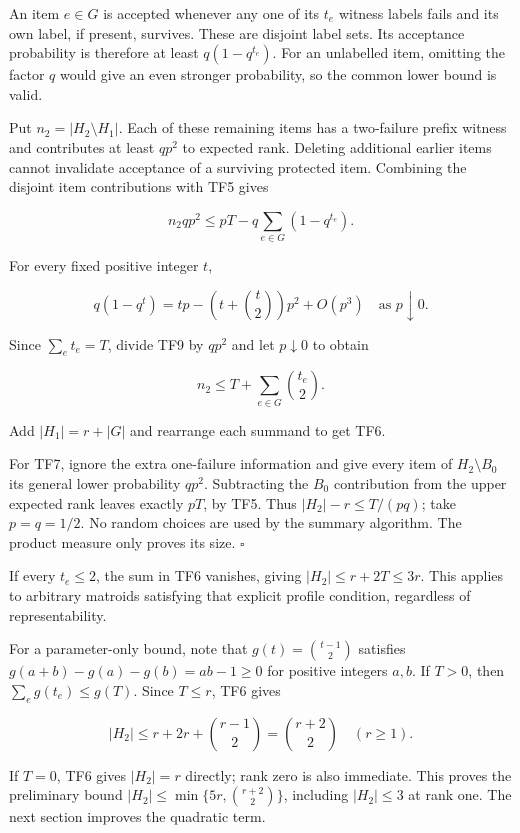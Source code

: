 An item \(e\in G\) is accepted whenever any one of its \(t_e\) witness labels fails and its own label, if present, survives. These are disjoint label sets. Its acceptance probability is therefore at least \(q(1-q^{t_e})\). For an unlabelled item, omitting the factor \(q\) would give an even stronger probability, so the common lower bound is valid.

Put \(n_2=|H_2\setminus H_1|\). Each of these remaining items has a two-failure prefix witness and contributes at least \(qp^2\) to expected rank. Deleting additional earlier items cannot invalidate acceptance of a surviving protected item. Combining the disjoint item contributions with TF5 gives

\[
n_2qp^2
\le pT-q\sum_{e\in G}(1-q^{t_e}).
\tag{TF9}
\]

For every fixed positive integer \(t\),

\[
q(1-q^t)
 =tp-\left(t+\binom{t}{2}\right)p^2+O(p^3)
\quad\text{as }p\downarrow0.
\]

Since \(\sum_e t_e=T\), divide TF9 by \(qp^2\) and let \(p\downarrow0\) to obtain

\[
n_2\le T+\sum_{e\in G}\binom{t_e}{2}.
\]

Add \(|H_1|=r+|G|\) and rearrange each summand to get TF6.

For TF7, ignore the extra one-failure information and give every item of \(H_2\setminus B_0\) its general lower probability \(qp^2\). Subtracting the \(B_0\) contribution from the upper expected rank leaves exactly \(pT\), by TF5. Thus \(|H_2|-r\le T/(pq)\); take \(p=q=1/2\). No random choices are used by the summary algorithm. The product measure only proves its size. \(\square\)

If every \(t_e\le2\), the sum in TF6 vanishes, giving \(|H_2|\le r+2T\le3r\). This applies to arbitrary matroids satisfying that explicit profile condition, regardless of representability.

For a parameter-only bound, note that \(g(t)=\binom{t-1}{2}\) satisfies \(g(a+b)-g(a)-g(b)=ab-1\ge0\) for positive integers \(a,b\). If \(T>0\), then \(\sum_e g(t_e)\le g(T)\). Since \(T\le r\), TF6 gives

\[
|H_2|\le r+2r+\binom{r-1}{2}=\binom{r+2}{2}
\quad(r\ge1).
\]

If \(T=0\), TF6 gives \(|H_2|=r\) directly; rank zero is also immediate. This proves the preliminary bound \(|H_2|\le\min\{5r,\binom{r+2}{2}\}\), including \(|H_2|\le3\) at rank one. The next section improves the quadratic term.

